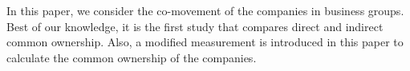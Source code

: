 \documentclass[12pt, a4paper]{article}
\begin{document}
	
		In this paper, we consider the co-movement of the companies in business groups. Best of our knowledge, it is the first study that compares direct and indirect common ownership. Also, a modified measurement is introduced in this paper to calculate the common ownership of the companies. 












	


	
\newpage
	{
	\footnotesize
	
	
}
\end{document}
